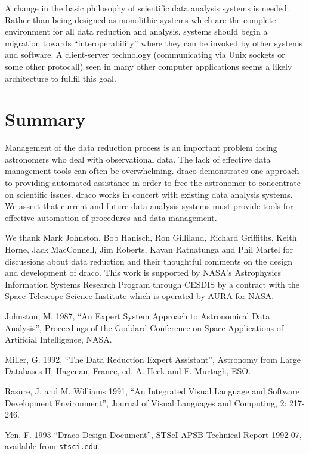 A change in the basic philosophy of scientific data analysis systems is 
needed. Rather than being designed as monolithic systems which are the 
complete environment for all data reduction and analysis, systems should 
begin a migration towards ``interoperability'' where they can be invoked by 
other systems and software. A client-server technology (communicating via 
Unix sockets or some other protocall) seen in many other computer 
applications seems a likely architecture to fullfil this goal. 

\section{Summary}

Management of the data reduction process is an important problem facing 
astronomers who deal with observational data. The lack of effective data 
management tools can often be overwhelming. 
{\sc draco} demonstrates one approach to providing automated assistance 
in order to free the astronomer to concentrate on scientific issues. {\sc 
draco} works in concert with existing data analysis systems.
We assert that current and future data analysis systems must provide 
tools for effective automation of procedures and data management.


\acknowledgments

We thank Mark Johnston, Bob Hanisch, Ron Gilliland, Richard Griffiths, 
Keith Horne, Jack MacConnell, Jim Roberts, Kavan Ratnatunga and Phil Martel 
for discussions about data reduction and their thoughtful comments on the 
design and development of {\sc draco}. This work is supported by NASA's 
Astrophysics Information Systems Research Program through CESDIS by a 
contract with the Space Telescope Science Institute which is operated by 
AURA for NASA. 


\begin{references}

 Johnston, M. 1987, ``An Expert System Approach to Astronomical 
Data Analysis'', Proceedings of the Goddard Conference on Space Applications 
of Artificial Intelligence, NASA. 

 Miller, G. 1992, ``The Data Reduction Expert Assistant'', 
Astronomy from Large Databases II, Hagenau, France, ed. A. Heck and F. 
Murtagh, ESO.

 Rasure, J. and M. Williams 1991, ``An Integrated Visual Language 
and Software Development Environment'', Journal of Visual Languages and 
Computing, 2: 217-246.

 Yen, F. 1993 ``Draco Design Document'', STScI APSB Technical 
Report 1992-07, available from {\tt stsci.edu}.


\end{references}



